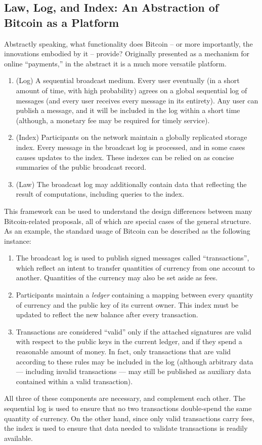 \subsection{Law, Log, and Index: An Abstraction of Bitcoin as a Platform}

Abstractly speaking, what functionality does Bitcoin -- or more importantly, the innovations embodied by it -- provide? Originally presented as a mechanism for online ``payments,'' in the abstract it is a much more versatile platform.

\begin{enumerate}
\item (Log) A sequential broadcast medium. Every user eventually (in a short amount of time, with high probability) agrees on a global sequential log of messages (and every user receives every message in its entirety). Any user can publish a message, and it will be included in the log within a short time (although, a monetary fee may be required for timely service).
\item (Index) Participants on the network maintain a globally replicated storage index. Every message in the broadcast log is processed, and in some cases causes updates to the index. These indexes can be relied on as concise summaries of the public broadcast record.
\item (Law) The broadcast log may additionally contain data that reflecting the result of computations, including queries to the index.
\end{enumerate}

This framework can be used to understand the design differences between many Bitcoin-related proposals, all of which are special cases of the general structure. As an example, the standard usage of Bitcoin can be described as the following instance:
\begin{enumerate}
\item The broadcast log is used to publish signed messages called ``transactions'', which reflect an intent to transfer quantities of currency from one account to another. Quantities of the currency may also be set aside as fees.
\item Participants maintain a \emph{ledger} containing a mapping between every quantity of currency and the public key of its current owner. This index must be updated to reflect the new balance after every transaction.
\item Transactions are considered ``valid'' only if the attached signatures are valid with respect to the public keys in the current ledger, and if they spend a reasonable amount of money. In fact, only transactions that are valid according to these rules may be included in the log (although arbitrary data --- including invalid transactions --- may still be published as auxiliary data contained within a valid transaction).
\end{enumerate}
All three of these components are necessary, and complement each other. The sequential log is used to ensure that no two transactions double-spend the same quantity of currency. On the other hand, since only valid transactions carry fees, the index is used to ensure that data needed to validate transactions is readily available.

